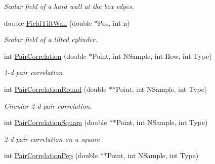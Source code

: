 \begin{DoxyCompactItemize}
\begin{DoxyCompactList}\small\item\em Scalar field of a hard wall at the box edges. \end{DoxyCompactList}\item 
double \hyperlink{classVarData_ac0f4a9896eb935a803850787a5684858}{Field\+Tilt\+Wall} (double $\ast$Pos, int n)\hypertarget{classVarData_ac0f4a9896eb935a803850787a5684858}{}\label{classVarData_ac0f4a9896eb935a803850787a5684858}

\begin{DoxyCompactList}\small\item\em Scalar field of a tilted cylinder. \end{DoxyCompactList}\item 
int \hyperlink{classVarData_a510c054d13fe1a0f08ce51e357943a83}{Pair\+Correlation} (double $\ast$Point, int N\+Sample, int How, int Type)\hypertarget{classVarData_a510c054d13fe1a0f08ce51e357943a83}{}\label{classVarData_a510c054d13fe1a0f08ce51e357943a83}

\begin{DoxyCompactList}\small\item\em 1-\/d pair correlation \end{DoxyCompactList}\item 
int \hyperlink{classVarData_a8e19dbeb530f71fe335e0c0e4dc461c7}{Pair\+Correlation\+Round} (double $\ast$$\ast$Point, int N\+Sample, int Type)\hypertarget{classVarData_a8e19dbeb530f71fe335e0c0e4dc461c7}{}\label{classVarData_a8e19dbeb530f71fe335e0c0e4dc461c7}

\begin{DoxyCompactList}\small\item\em Circular 2-\/d pair correlation. \end{DoxyCompactList}\item 
int \hyperlink{classVarData_ac6d1ad4d99c748934659e3023246e766}{Pair\+Correlation\+Square} (double $\ast$$\ast$Point, int N\+Sample, int Type)\hypertarget{classVarData_ac6d1ad4d99c748934659e3023246e766}{}\label{classVarData_ac6d1ad4d99c748934659e3023246e766}

\begin{DoxyCompactList}\small\item\em 2-\/d pair correlation on a square \end{DoxyCompactList}\item 
int \hyperlink{classVarData_a4b5e0c5a85245095780f116b7432df5b}{Pair\+Correlation\+Pep} (double $\ast$$\ast$Point, int N\+Sample, int Type)\hypertarget{classVarData_a4b5e0c5a85245095780f116b7432df5b}{}\label{classVarData_a4b5e0c5a85245095780f116b7432df5b}


\end{DoxyCompactItemize}

